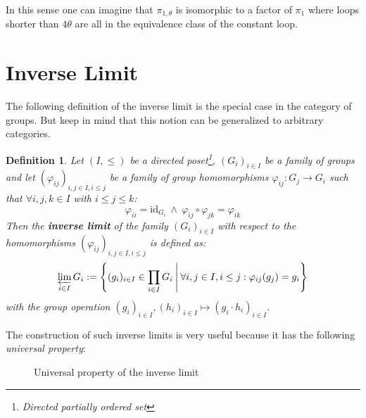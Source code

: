 \documentclass[a4paper, 11pt, twoside]{article}
\theoremstyle{break}
\theoremstyle{break}
\newtheorem{defin}[thm]{Definition}
\begin{document}
In this sense one can imagine that $\pi_{1,\theta}$ is isomorphic to a factor of $\pi_1$ where loops shorter than $4\theta$ are all in the equivalence class of the constant loop.

\section{Inverse Limit}

The following definition of the inverse limit is the special case in the category of groups. 
But keep in mind that this notion can be generalized to arbitrary categories.
\begin{defin}
  Let $(I, \leq)$ be a directed poset\footnote{Directed partially ordered set}, 
  $(G_i)_{i\in I}$ be a family of groups and let $(\varphi_{ij})_{i,j \in I, i \leq j}$ be a family of group homomorphisms $\varphi_{ij}: G_j \to G_i$ such that $\forall i,j,k \in I$ with $i \leq j \leq k$:
  \begin{equation*}
    \varphi_{ii} = \text{id}_{G_i} \: \land \: \varphi_{ij} \circ \varphi_{jk} = \varphi_{ik}
  \end{equation*}
  Then the \textbf{inverse limit} of the family $(G_i)_{i\in I}$ with respect to the homomorphisms $(\varphi_{ij})_{i,j \in I, i \leq j}$ is defined as:
  \begin{equation*}
    \varprojlim_{i\in I} G_i := \left\{(g_i)_{i\in I} \in \prod_{i\in I} G_i \: \middle| \: \forall i,j \in I, i \leq j: \varphi_{ij}(g_j) = g_i\right\}
  \end{equation*}
  with the group operation $(g_i)_{i\in I}, (h_i)_{i\in I} \mapsto (g_i \cdot h_i)_{i\in I}$.
\end{defin}

The construction of such inverse limits is very useful because it has the following \textit{universal property}:
\begin{figure}[ht!]
  \centering
  \caption{Universal property of the inverse limit}\label{fig:inverse-limit}
\end{figure}
\end{document}
